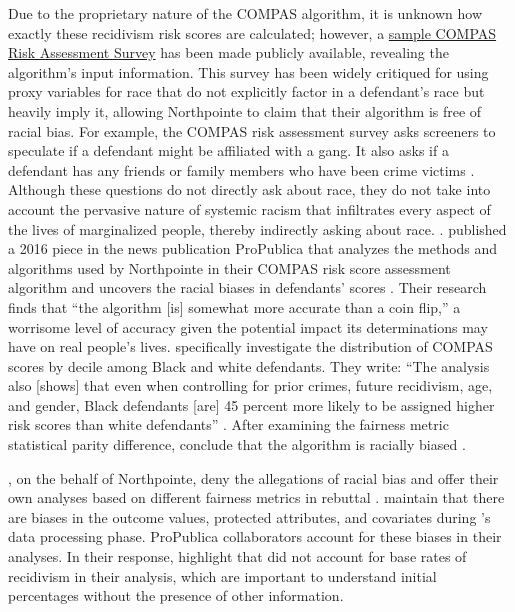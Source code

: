 \documentclass[water,article,submit,moreauthors,pdftex]{mdpi}
\begin{document}
Due to the proprietary nature of the COMPAS algorithm, it is unknown how
exactly these recidivism risk scores are calculated; however, a
\href{https://www.documentcloud.org/documents/2702103-Sample-Risk-Assessment-COMPAS-CORE\#document/p5/a296598}{sample
COMPAS Risk Assessment Survey} has been made publicly available,
revealing the algorithm's input information. This survey has been widely
critiqued for using proxy variables for race that do not explicitly
factor in a defendant's race but heavily imply it, allowing Northpointe
to claim that their algorithm is free of racial bias. For example, the
COMPAS risk assessment survey asks screeners to speculate if a defendant
might be affiliated with a gang. It also asks if a defendant has any
friends or family members who have been crime victims
\citep{Angwin2016Sample}. Although these questions do not directly ask
about race, they do not take into account the pervasive nature of
systemic racism that infiltrates every aspect of the lives of
marginalized people, thereby indirectly asking about race.
\citet{angwin2016machine}. published a 2016 piece in the news
publication ProPublica that analyzes the methods and algorithms used by
Northpointe in their COMPAS risk score assessment algorithm and uncovers
the racial biases in defendants' scores \citep{angwin2016machine}. Their
research finds that ``the algorithm {[}is{]} somewhat more accurate than
a coin flip,'' a worrisome level of accuracy given the potential impact
its determinations may have on real people's lives.
\citet{angwin2016machine} specifically investigate the distribution of
COMPAS scores by decile among Black and white defendants. They write:
``The analysis also {[}shows{]} that even when controlling for prior
crimes, future recidivism, age, and gender, Black defendants {[}are{]}
45 percent more likely to be assigned higher risk scores than white
defendants'' \citep{larson2016we}. After examining the fairness metric
statistical parity difference, \citet{angwin2016machine} conclude that
the algorithm is racially biased \citep{larson2016we}.

\citet{equivant_response_2016}, on the behalf of Northpointe, deny the
allegations of racial bias and offer their own analyses based on
different fairness metrics in rebuttal \citep{equivant_response_2016}.
\citet{angwin2016machine} maintain that there are biases in the outcome
values, protected attributes, and covariates during
\citet{equivant_response_2016}'s data processing phase. ProPublica
collaborators \citet{larson2016we} account for these biases in their
analyses. In their response, \citet{equivant_response_2016} highlight
that \citet{angwin2016machine} did not account for base rates of
recidivism in their analysis, which are important to understand initial
percentages without the presence of other information.
\end{document}
